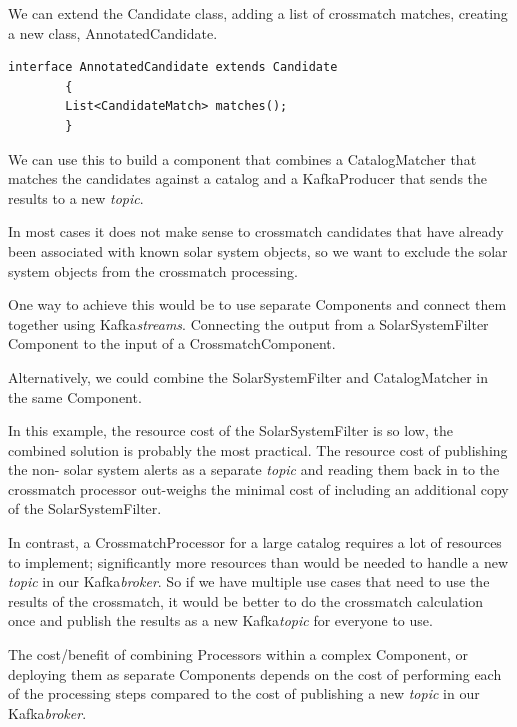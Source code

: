 \documentclass{article}
\newcommand{\kafka} {Kafka\xspace}
\newcommand{\kftopic} {\textit{topic}\xspace}
\newcommand{\kfstreams} {\textit{streams}\xspace}
\newcommand{\kfbroker} {\textit{broker}\xspace}
\newcommand{\crossmatch} {crossmatch\xspace}
\newcommand{\catalog} {catalog\xspace}
\newcommand{\javaname}[1] {{\ttfamily\color{codeblue} #1}}
\newcommand{\javaplural}[1] {\javaname{#1}s}
\begin{document}
We can extend the \javaname{Candidate} class, adding a list of \crossmatch matches, creating a new class, \javaname{AnnotatedCandidate}.

\begin{lstlisting}[style=Java]
    interface AnnotatedCandidate extends Candidate
        {
        List<CandidateMatch> matches();
        }
\end{lstlisting}

We can use this to build a component that combines a \javaname{CatalogMatcher} that matches the candidates against a \catalog and a \javaname{KafkaProducer} that sends the results to a new \kftopic.

In most cases it does not make sense to \crossmatch candidates that have already been associated with known solar system objects, so we want to exclude the solar system objects from the \crossmatch processing.

One way to achieve this would be to use separate \javaplural{Component} and connect them together using \kafka \kfstreams. Connecting the output from a \javaname{SolarSystemFilter} \javaname{Component} to the input of a \javaname{CrossmatchComponent}.

Alternatively, we could combine the \javaname{SolarSystemFilter} and \javaname{CatalogMatcher} in the same \javaname{Component}.

In this example, the resource cost of the \javaname{SolarSystemFilter} is so low, the combined solution is probably the most practical. The resource cost of publishing the non- solar system alerts as a separate \kftopic and reading them back in to the \crossmatch processor out-weighs the minimal cost of including an additional copy of the \javaname{SolarSystemFilter}.

In contrast, a \javaname{CrossmatchProcessor} for a large \catalog requires a lot of resources to implement; significantly more resources than would be needed to handle a new \kftopic in our \kafka \kfbroker. So if we have multiple use cases that need to use the results of the \crossmatch, it would be better to do the \crossmatch calculation once and publish the results as a new \kafka \kftopic for everyone to use.

The cost/benefit of combining \javaplural{Processor} within a complex \javaname{Component}, or deploying them as separate \javaplural{Component} depends on the cost of performing each of the processing steps compared to the cost of publishing a new \kftopic in our \kafka \kfbroker.
\end{document}

